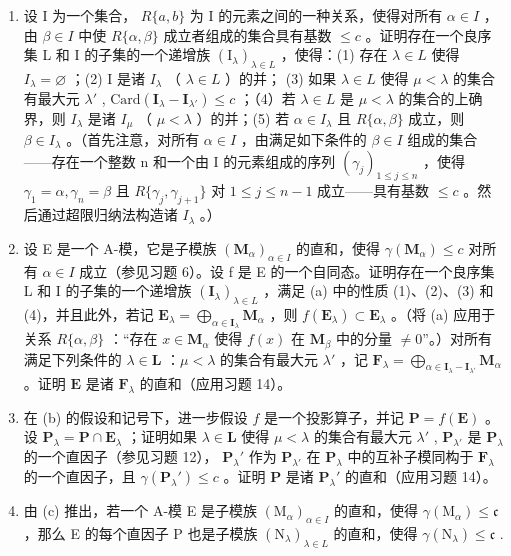 \begin{enumerate}
\def\labelenumi{(\alph{enumi})}
\item
  设 I 为一个集合， \(R\{a, b\}\) 为 I 的元素之间的一种关系，使得对所有 \(\alpha \in I\) ，由 \(\beta \in I\) 中使 \(R\{\alpha, \beta\}\) 成立者组成的集合具有基数 \(\leqslant c\) 。证明存在一个良序集 L 和 I 的子集的一个递增族 \((\mathrm{I}_{\lambda})_{\lambda \in L}\) ，使得：(1) 存在 \(\lambda \in L\) 使得 \(I_{\lambda} = \varnothing\) ；(2) I 是诸 \(I_{\lambda}\) （ \(\lambda \in L\) ）的并； (3) 如果 \(\lambda \in L\) 使得 \(\mu < \lambda\) 的集合有最大元 \(\lambda'\) , \(\text{Card}(\mathbf{I}_{\lambda} - \mathbf{I}_{\lambda'}) \leqslant c\) ；（4）若 \(\lambda \in L\) 是 \(\mu < \lambda\) 的集合的上确界，则 \(I_{\lambda}\) 是诸 \(I_{\mu}\) （ \(\mu < \lambda\) ）的并；(5) 若 \(\alpha \in I_{\lambda}\) 且 \(R\{\alpha, \beta\}\) 成立，则 \(\beta \in I_{\lambda}\) 。（首先注意，对所有 \(\alpha \in I\) ，由满足如下条件的 \(\beta \in I\) 组成的集合——存在一个整数 n 和一个由 I 的元素组成的序列 \((\gamma_{j})_{1 \leqslant j \leqslant n}\) ，使得 \(\gamma_{1} = \alpha, \gamma_{n} = \beta\) 且 \(R\{\gamma_{j}, \gamma_{j+1}\}\) 对 \(1 \leqslant j \leqslant n - 1\) 成立——具有基数 \(\leqslant c\) 。然后通过超限归纳法构造诸 \(I_{\lambda}\) 。）
\item
  设 E 是一个 A-模，它是子模族 \((\mathbf{M}_{\alpha})_{\alpha\in I}\) 的直和，使得 \(\gamma(\mathbf{M}_{\alpha})\leqslant c\) 对所有 \(\alpha\in I\) 成立（参见习题 6）。设 f 是 E 的一个自同态。证明存在一个良序集 L 和 I 的子集的一个递增族 \((\mathbf{I}_{\lambda})_{\lambda\in L}\) ，满足 (a) 中的性质 (1)、(2)、(3) 和 (4)，并且此外，若记 \(\mathbf{E}_{\lambda} = \bigoplus_{\alpha \in \mathbf{I}_{\lambda}} \mathbf{M}_{\alpha}\) ，则 \(f(\mathbf{E}_{\lambda}) \subset \mathbf{E}_{\lambda}\) 。（将 (a) 应用于关系 \(R\{\alpha, \beta\}\) ：“存在 \(x \in \mathbf{M}_{\alpha}\) 使得 \(f(x)\) 在 \(\mathbf{M}_{\beta}\) 中的分量 \(\neq 0\)”。）对所有满足下列条件的 \(\lambda \in \mathbf{L}\) ：\(\mu < \lambda\) 的集合有最大元 \(\lambda'\) ，记 \(\mathbf{F}_{\lambda} = \bigoplus_{\alpha \in \mathbf{I}_{\lambda} - \mathbf{I}_{\lambda'}} \mathbf{M}_{\alpha}\) 。证明 \(\mathbf{E}\) 是诸 \(\mathbf{F}_{\lambda}\) 的直和（应用习题 14）。
\item
  在 (b) 的假设和记号下，进一步假设 \(f\) 是一个投影算子，并记 \(\mathbf{P} = f(\mathbf{E})\) 。设 \(\mathbf{P}_{\lambda} = \mathbf{P} \cap \mathbf{E}_{\lambda}\) ；证明如果 \(\lambda \in \mathbf{L}\) 使得 \(\mu < \lambda\) 的集合有最大元 \(\lambda'\) , \(\mathbf{P}_{\lambda'}\) 是 \(\mathbf{P}_{\lambda}\) 的一个直因子（参见习题 12）， \(\mathbf{P}_{\lambda}'\) 作为 \(\mathbf{P}_{\lambda'}\) 在 \(\mathbf{P}_{\lambda}\) 中的互补子模同构于 \(\mathbf{F}_{\lambda}\) 的一个直因子，且 \(\gamma(\mathbf{P}_{\lambda}') \leqslant c\) 。证明 \(\mathbf{P}\) 是诸 \(\mathbf{P}_{\lambda}'\) 的直和（应用习题 14）。
\item
  由 (c) 推出，若一个 A-模 E 是子模族 \((\mathrm{M}_{\alpha})_{\alpha\in I}\) 的直和，使得 \(\gamma(\mathrm{M}_{\alpha})\leqslant\mathfrak{c}\) ，那么 E 的每个直因子 P 也是子模族 \((\mathrm{N}_{\lambda})_{\lambda\in L}\) 的直和，使得 \(\gamma(\mathrm{N}_{\lambda})\leqslant\mathfrak{c}\) .
\end{enumerate}

